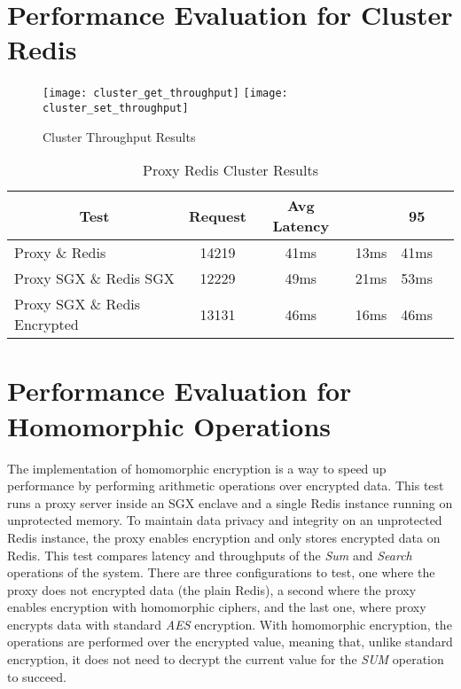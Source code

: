 \section{Performance Evaluation for Cluster Redis}
\label{sec:performance_evaluation_cluster_redis}

\begin{figure}[htbp]
  \centering
    {\texttt{[image: cluster\_get\_throughput]}}%
    {\texttt{[image: cluster\_set\_throughput]}}%
  \caption{Cluster Throughput Results}
  \label{fig:cluster_throughput_results}
\end{figure}

\begin{table}[ht]
	\caption{Proxy Redis Cluster Results}
	\label{tab:proxy_redis_cluster_latency_results}
\centering
\begin{tabular}{lccccc}
	\toprule
	\multicolumn{1}{c}{\textbf{Test}} & \pmb{\#}\textbf{Request} & \textbf{Avg Latency} & \pmb{\ensuremath{\sigma}} & \textbf{95}\pmb{\%} \\
	\midrule
		Proxy \& Redis & 14219 & 41ms & 13ms & 41ms  				\\
		Proxy SGX \& Redis SGX & 12229 & 49ms & 21ms & 53ms  		\\
		Proxy SGX \& Redis Encrypted & 13131 & 46ms & 16ms & 46ms 	\\
	\bottomrule
\end{tabular}
\end{table}

\section{Performance Evaluation for Homomorphic Operations}
\label{sec:performance_evaluation_homomorphic_operations}

The implementation of homomorphic encryption is a way to speed up performance by performing arithmetic operations over encrypted data. This test runs a proxy server inside an \gls{SGX} enclave and a single Redis instance running on unprotected memory. To maintain data privacy and integrity on an unprotected Redis instance, the proxy enables encryption and only stores encrypted data on Redis. This test compares latency and throughputs of the \textit{Sum} and \textit{Search} operations of the system. There are three configurations to test, one where the proxy does not encrypted data (the plain Redis), a second where the proxy enables encryption with homomorphic ciphers, and the last one, where proxy encrypts data with standard \textit{AES} encryption. With homomorphic encryption, the operations are performed over the encrypted value, meaning that, unlike standard encryption, it does not need to decrypt the current value for the \textit{SUM} operation to succeed.

